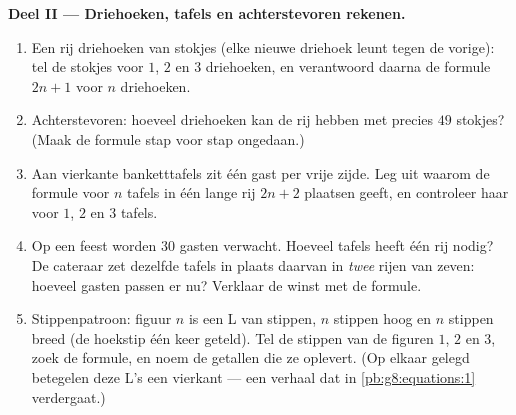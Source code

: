 \begin{problem}
\medskip
\noindent\textbf{Deel II --- Driehoeken, tafels en achterstevoren rekenen.}
\begin{enumerate}[resume]
  \item Een rij driehoeken van stokjes (elke nieuwe driehoek leunt tegen de
        vorige): tel de stokjes voor $1$, $2$ en $3$ driehoeken, en verantwoord
        daarna de formule $2n + 1$ voor $n$ driehoeken.
  \item Achterstevoren: hoeveel driehoeken kan de rij hebben met precies $49$
        stokjes? (Maak de formule stap voor stap ongedaan.)
  \item Aan vierkante banketttafels zit één gast per vrije zijde. Leg uit waarom de
        formule voor $n$ tafels in één lange rij $2n + 2$ plaatsen geeft, en
        controleer haar voor $1$, $2$ en $3$ tafels.
  \item Op een feest worden $30$ gasten verwacht. Hoeveel tafels heeft één rij
        nodig? De cateraar zet dezelfde tafels in plaats daarvan in \emph{twee}
        rijen van zeven: hoeveel gasten passen er nu? Verklaar de winst met de
        formule.
  \item Stippenpatroon: figuur $n$ is een L van stippen, $n$ stippen hoog en $n$
        stippen breed (de hoekstip één keer geteld). Tel de stippen van de figuren
        $1$, $2$ en $3$, zoek de formule, en noem de getallen die ze oplevert. (Op
        elkaar gelegd betegelen deze L's een vierkant --- een verhaal dat in
        \cref{pb:g8:equations:1} verdergaat.)
\end{enumerate}


\end{problem}
